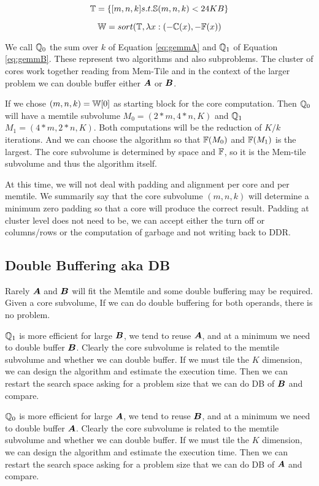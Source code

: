 \documentclass[conference]{IEEEtran}
\begin{document}
\begin{equation}
  \mathbb{T} = \{ [m,n,k]\relax{ s.t. }\mathbb{S}(m,n,k)< 24 KB \}
\end{equation}

\begin{equation}
  \mathbb{W} =  sort(\mathbb{T}, \lambda x: (-\mathbb{C}(x), -\mathbb{F}(x) )
\end{equation}
 

We call $\mathbb{Q}_0$ the sum over $k$ of Equation \ref{eq:gemmA} and
$\mathbb{Q}_1$ of Equation \ref{eq:gemmB}. These represent two algorithms and
also subproblems. The cluster of cores work together reading from
Mem-Tile and in the context of the larger problem we can double buffer
either ${\boldsymbol A}$ or ${\boldsymbol B}$.

If we chose $(m,n,k) = \mathbb{W}[0]$ as starting block for the core
computation. Then $\mathbb{Q}_0$ will have a memtile subvolume
$M_0=(2*m,4*n,K)$ and $\mathbb{Q}_1$ $M_1=(4*m,2*n,K)$. Both computations
will be the reduction of $K/k$ iterations. And we can choose the
algorithm so that $\mathbb{F}(M_0)$ and $\mathbb{F}(M_1)$ is the largest. The core
subvolume is determined by space and $\mathbb{F}$, so it is the Mem-tile
subvolume and thus the algorithm itself.

At this time, we will not deal with padding and alignment per core and
per memtile. We summarily say that the core subvolume $(m,n,k)$ will
determine a minimum zero padding so that a core will produce the
correct result. Padding at cluster level does not need to be, we can
accept either the turn off or columns/rows or the computation of
garbage and not writing back to DDR.

\subsection{Double Buffering aka DB}  

Rarely ${\boldsymbol A}$ and ${\boldsymbol B}$ will fit the Memtile and some double
buffering may be required. Given a core subvolume, If we can do double
buffering for both operands, there is no problem.


$\mathbb{Q}_1$ is more efficient for large ${\boldsymbol B}$, we tend to reuse
${\boldsymbol A}$, and at a minimum we need to double buffer ${\boldsymbol B}$. Clearly
the core subvolume is related to the memtile subvolume and whether we
can double buffer. If we must tile the $K$ dimension, we can design
the algorithm and estimate the execution time. Then we can restart the
search space asking for a problem size that we can do DB of ${\boldsymbol B}$
and compare.

$\mathbb{Q}_0$ is more efficient for large ${\boldsymbol A}$, we tend to reuse
${\boldsymbol B}$, and at a minimum we need to double buffer ${\boldsymbol A}$. Clearly
the core subvolume is related to the memtile subvolume and whether we
can double buffer. If we must tile the $K$ dimension, we can design
the algorithm and estimate the execution time. Then we can restart the
search space asking for a problem size that we can do DB of ${\boldsymbol A}$
and compare.
\end{document}
